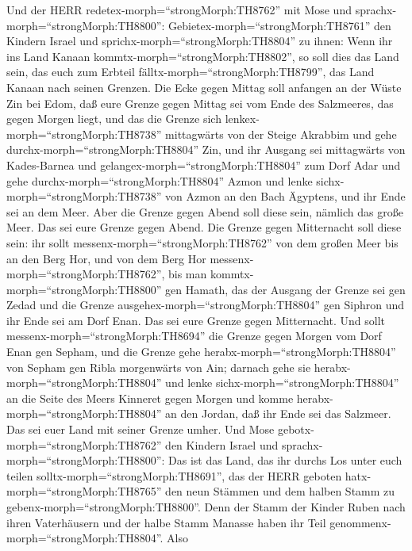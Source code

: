  Und der HERR redetex-morph=``strongMorph:TH8762'' mit Mose
und sprachx-morph=``strongMorph:TH8800'': 
Gebietex-morph=``strongMorph:TH8761'' den Kindern Israel und
sprichx-morph=``strongMorph:TH8804'' zu ihnen: Wenn ihr ins Land Kanaan
kommtx-morph=``strongMorph:TH8802'', so soll dies das Land sein, das
euch zum Erbteil fälltx-morph=``strongMorph:TH8799'', das Land Kanaan
nach seinen Grenzen.  Die Ecke gegen Mittag soll anfangen an
der Wüste Zin bei Edom, daß eure Grenze gegen Mittag sei vom Ende des
Salzmeeres, das gegen Morgen liegt,  und das die Grenze sich
lenkex-morph=``strongMorph:TH8738'' mittagwärts von der Steige Akrabbim
und gehe durchx-morph=``strongMorph:TH8804'' Zin, und ihr Ausgang sei
mittagwärts von Kades-Barnea und gelangex-morph=``strongMorph:TH8804''
zum Dorf Adar und gehe durchx-morph=``strongMorph:TH8804'' Azmon
 und lenke sichx-morph=``strongMorph:TH8738'' von Azmon an
den Bach Ägyptens, und ihr Ende sei an dem Meer.  Aber die
Grenze gegen Abend soll diese sein, nämlich das große Meer. Das sei eure
Grenze gegen Abend.  Die Grenze gegen Mitternacht soll diese
sein: ihr sollt messenx-morph=``strongMorph:TH8762'' von dem großen Meer
bis an den Berg Hor,  und von dem Berg Hor
messenx-morph=``strongMorph:TH8762'', bis man
kommtx-morph=``strongMorph:TH8800'' gen Hamath, das der Ausgang der
Grenze sei gen Zedad  und die Grenze
ausgehex-morph=``strongMorph:TH8804'' gen Siphron und ihr Ende sei am
Dorf Enan. Das sei eure Grenze gegen Mitternacht.  Und
sollt messenx-morph=``strongMorph:TH8694'' die Grenze gegen Morgen vom
Dorf Enan gen Sepham,  und die Grenze gehe
herabx-morph=``strongMorph:TH8804'' von Sepham gen Ribla morgenwärts von
Ain; darnach gehe sie herabx-morph=``strongMorph:TH8804'' und lenke
sichx-morph=``strongMorph:TH8804'' an die Seite des Meers Kinneret gegen
Morgen  und komme herabx-morph=``strongMorph:TH8804'' an
den Jordan, daß ihr Ende sei das Salzmeer. Das sei euer Land mit seiner
Grenze umher.  Und Mose gebotx-morph=``strongMorph:TH8762''
den Kindern Israel und sprachx-morph=``strongMorph:TH8800'': Das ist das
Land, das ihr durchs Los unter euch teilen
solltx-morph=``strongMorph:TH8691'', das der HERR geboten
hatx-morph=``strongMorph:TH8765'' den neun Stämmen und dem halben Stamm
zu gebenx-morph=``strongMorph:TH8800''.  Denn der Stamm der
Kinder Ruben nach ihren Vaterhäusern und der halbe Stamm Manasse haben
ihr Teil genommenx-morph=``strongMorph:TH8804''.  Also
